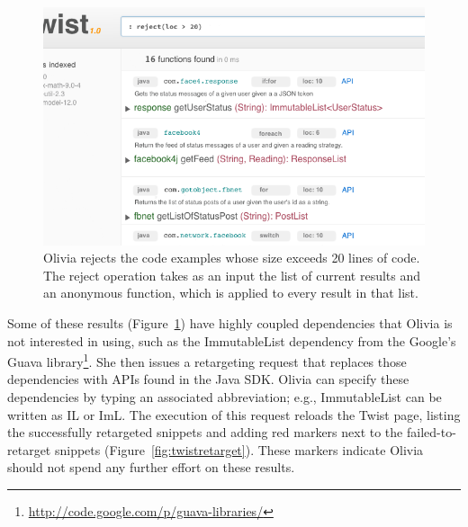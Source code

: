 \begin{figure}[!ht]
    \centering
    \includegraphics[width=\textwidth]{images/twistslash}
    \caption{Olivia rejects the code examples whose size exceeds 20 lines of code. The 
	 reject operation takes as an input the list of current results and an anonymous function, 
	 which is applied to every result in that list.}
    \label{fig:twistslash}
\end{figure}  

Some of these results (Figure~\ref{fig:twistslash}) have highly coupled dependencies that Olivia is not interested in using, such as the ImmutableList dependency from the Google's Guava library\footnote{\url{http://code.google.com/p/guava-libraries/}}. She then issues a retargeting request that replaces those dependencies with APIs found in the Java SDK. Olivia can specify these dependencies by typing an associated abbreviation; e.g., ImmutableList can be written as IL or ImL. The execution of this request reloads the Twist page, listing the successfully retargeted snippets and adding red markers next to the failed-to-retarget snippets (Figure~\ref{fig:twistretarget}). These markers indicate Olivia should not spend any further effort on these results. 

